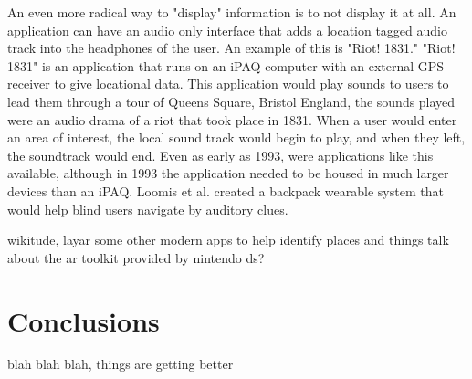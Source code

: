 \documentclass{acm_proc_article-sp}
\begin{document}
An even more radical way to "display" information is to not display it at all.  An application can have an audio only interface that adds a location tagged audio track into the headphones of the user.  An example of this is "Riot! 1831." "Riot! 1831" is an application that runs on an iPAQ computer with an external GPS receiver to give locational data. This application would play sounds to users to lead them through a tour of Queens Square, Bristol England, the sounds played were an audio drama of a riot that took place in 1831.  When a user would enter an area of interest, the local sound track would begin to play, and when they left, the soundtrack would end. \cite{reid2004riot} \cite{reid2005parallel}   Even as early as 1993, were applications like this available, although in 1993 the application needed to be housed in much larger devices than an iPAQ.  Loomis et al. created a backpack wearable system that would help blind users navigate by auditory clues. \cite{loomis1994personal}

wikitude, layar
some other modern apps to help identify places and things
talk about the ar toolkit provided by nintendo ds?

\section{Conclusions}
blah blah blah, things are getting better



\end{document}
